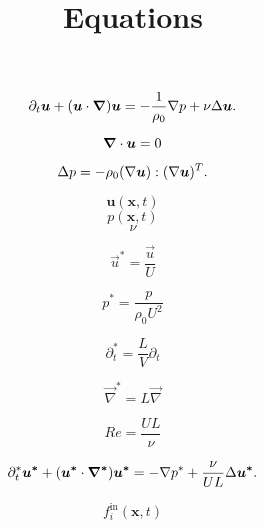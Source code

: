 \documentclass[a4paper,11pt]{article}
\title{Equations}
\newcommand{\vect}[1]{\boldsymbol{#1}}
\newcommand{\scalar}[2]{\vect{#1}\cdot\vect{#2}}
\newcommand{\nnabla}{{\bf \nabla}}
\newcommand{\laplacian}{{\Delta}}
\begin{document}
\maketitle

\begin{equation}\label{eq:navier-stokes}
\partial_t\vect{u} + (\scalar{u}{\nnabla})\vect{u} = -\frac{1}{\rho_0}\nnabla p + \nu \laplacian\vect{u}.
\end{equation}

\begin{equation}\label{eq:poisson}
\scalar{\nnabla}{u} = 0
\end{equation}

\begin{equation}\label{eq:poisson}
\laplacian p = -\rho_0 (\nnabla\vect{u}):(\nnabla\vect{u})^T.
\end{equation}

\begin{equation}
\vect{u}(\vect{x},t)
\end{equation}
\begin{equation}
p(\vect{x},t)
\end{equation}
\begin{equation}
\nu
\end{equation}

\begin{equation}
\vec{u}^* = \frac{\vec{u}}{U}
\end{equation}

\begin{equation}
p^* = \frac{p}{\rho_0 U^2}
\end{equation}

\begin{equation}
\partial_t^* = \frac{L}{V} \partial_t
\end{equation}

\begin{equation}
\vec{\nabla}^* = L\vec{\nabla}
\end{equation}

\begin{equation}
\mathit{Re} = \frac{UL}{\nu}
\end{equation}


\begin{equation}\label{eq:navier-stokes}
\partial_t^*\vect{u^*} + (\scalar{u^*}{\nabla ^*})\vect{u^*} = -\nnabla p ^* + \frac{\nu}{UL} \laplacian\vect{u^*}.
\end{equation}

\begin{equation}
f_i^\mathrm{in}(\vect{x},t)
\end{equation}
\end{document}
